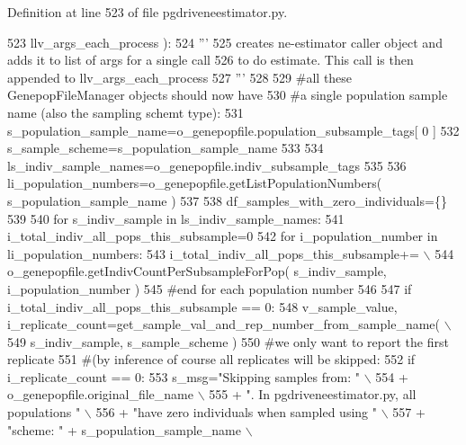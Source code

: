 Definition at line 523 of file pgdriveneestimator.\+py.


\begin{DoxyCode}
523                         llv\_args\_each\_process ):
524     \textcolor{stringliteral}{'''     }
525 \textcolor{stringliteral}{    creates ne-estimator caller object and adds it to list of args for a single call}
526 \textcolor{stringliteral}{    to do estimate.  This call is then appended to llv\_args\_each\_process}
527 \textcolor{stringliteral}{    '''}
528 
529     \textcolor{comment}{#all these GenepopFileManager objects should now have}
530     \textcolor{comment}{#a single population sample name (also the sampling schemt type):}
531     s\_population\_sample\_name=o\_genepopfile.population\_subsample\_tags[ 0 ]
532     s\_sample\_scheme=s\_population\_sample\_name
533 
534     ls\_indiv\_sample\_names=o\_genepopfile.indiv\_subsample\_tags
535 
536     li\_population\_numbers=o\_genepopfile.getListPopulationNumbers( s\_population\_sample\_name )
537 
538     df\_samples\_with\_zero\_individuals=\{\}
539 
540     \textcolor{keywordflow}{for} s\_indiv\_sample \textcolor{keywordflow}{in} ls\_indiv\_sample\_names:
541         i\_total\_indiv\_all\_pops\_this\_subsample=0
542         \textcolor{keywordflow}{for} i\_population\_number \textcolor{keywordflow}{in} li\_population\_numbers:
543             i\_total\_indiv\_all\_pops\_this\_subsample+= \(\backslash\)
544                     o\_genepopfile.getIndivCountPerSubsampleForPop( s\_indiv\_sample, i\_population\_number )
545         \textcolor{comment}{#end for each population number}
546 
547         \textcolor{keywordflow}{if} i\_total\_indiv\_all\_pops\_this\_subsample == 0:
548             v\_sample\_value, i\_replicate\_count=get\_sample\_val\_and\_rep\_number\_from\_sample\_name( \(\backslash\)
549                                         s\_indiv\_sample, s\_sample\_scheme )
550             \textcolor{comment}{#we only want to report the first replicate}
551             \textcolor{comment}{#(by inference of course all replicates will be skipped:}
552             \textcolor{keywordflow}{if} i\_replicate\_count == 0:
553                 s\_msg=\textcolor{stringliteral}{"Skipping samples from: "} \(\backslash\)
554                         + o\_genepopfile.original\_file\_name \(\backslash\)
555                         + \textcolor{stringliteral}{".  In pgdriveneestimator.py, all populations "} \(\backslash\)
556                         + \textcolor{stringliteral}{"have zero individuals when sampled using "} \(\backslash\)
557                         + \textcolor{stringliteral}{"scheme: "} + s\_population\_sample\_name  \(\backslash\)

\end{DoxyCode}
